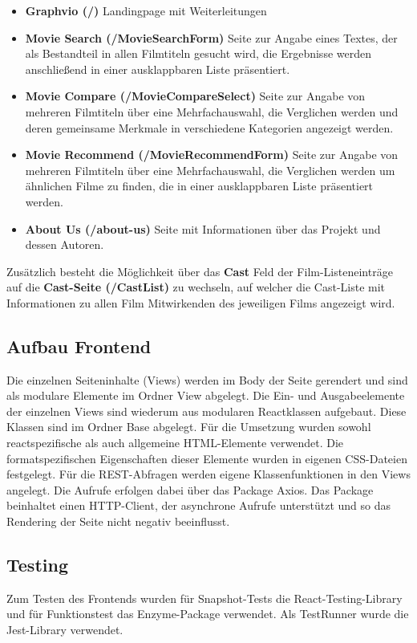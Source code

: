 \documentclass[conference]{IEEEtran}
\begin{document}
\begin{itemize}
    \item \textbf{Graphvio (/)}
    Landingpage mit Weiterleitungen
    \smallskip
    \item \textbf{Movie Search (/MovieSearchForm)}
    Seite zur Angabe eines Textes, der als Bestandteil in allen Filmtiteln gesucht wird, die Ergebnisse werden anschließend in einer ausklappbaren Liste präsentiert.
    \smallskip
    \item \textbf{Movie Compare (/MovieCompareSelect)}
    Seite zur Angabe von mehreren Filmtiteln über eine Mehrfachauswahl, die Verglichen werden und deren gemeinsame Merkmale in verschiedene Kategorien angezeigt werden.
    \smallskip
    \item \textbf{Movie Recommend (/MovieRecommendForm)}
    Seite zur Angabe von mehreren Filmtiteln über eine Mehrfachauswahl, die Verglichen werden um ähnlichen Filme zu finden, die in einer ausklappbaren Liste präsentiert werden.
    \smallskip
    \item \textbf{About Us (/about-us)}
    Seite mit Informationen über das Projekt und dessen Autoren.
\end{itemize}

Zusätzlich besteht die Möglichkeit über das \textbf{Cast} Feld der Film-Listeneinträge auf die  \textbf{Cast-Seite (/CastList)} zu wechseln,
auf welcher die Cast-Liste mit Informationen zu allen Film Mitwirkenden des jeweiligen Films angezeigt wird.

\subsection{Aufbau Frontend}

Die einzelnen Seiteninhalte (Views) werden im Body der Seite gerendert 
und sind als modulare Elemente im Ordner View abgelegt. 
Die Ein- und Ausgabeelemente der einzelnen Views sind wiederum aus modularen Reactklassen aufgebaut.
Diese Klassen sind im Ordner Base abgelegt. Für die Umsetzung wurden sowohl reactspezifische als auch 
allgemeine HTML-Elemente verwendet.
Die formatspezifischen Eigenschaften dieser Elemente wurden in eigenen CSS-Dateien festgelegt.
Für die REST-Abfragen werden eigene Klassenfunktionen in den Views angelegt.
Die Aufrufe erfolgen dabei über das Package Axios.\cite{axios}
Das Package beinhaltet einen HTTP-Client, 
der asynchrone Aufrufe unterstützt und so das Rendering der Seite nicht negativ beeinflusst.

\subsection{Testing}
Zum Testen des Frontends wurden für Snapshot-Tests die React-Testing-Library\cite{reactTest} und für Funktionstest das Enzyme-Package\cite{enzyme} verwendet. 
Als TestRunner wurde die Jest-Library verwendet.
\end{document}
